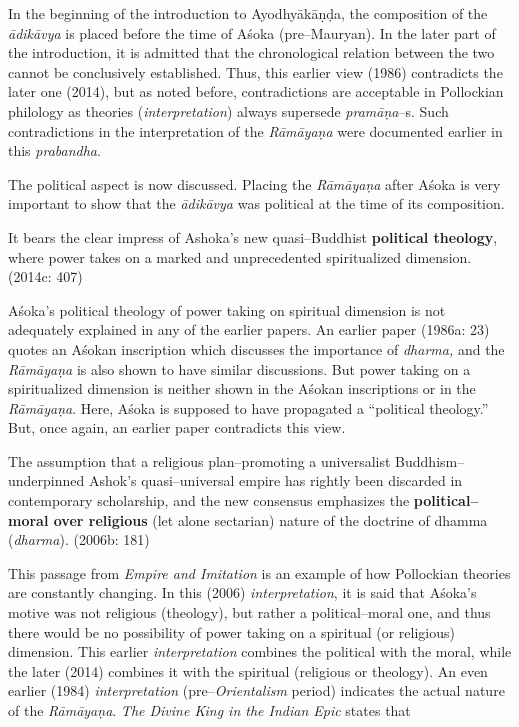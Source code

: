 In the beginning of the introduction to Ayodhyākāṇḍa, the composition of the \textit{ādikāvya} is placed before the time of Aśoka (pre–Mauryan). In the later part of the introduction, it is admitted that the chronological relation between the two cannot be conclusively established. Thus, this earlier view (1986) contradicts the later one (2014), but as noted before, contradictions are acceptable in Pollockian philology as theories (\textit{interpretation}) always supersede \textit{pramāṇa}–s. Such contradictions in the interpretation of the \textit{Rāmāyaṇa} were documented earlier in this \textit{prabandha}.

The political aspect is now discussed. Placing the \textit{Rāmāyaṇa }after Aśoka is very important to show that the \textit{ādikāvya} was political at the time of its composition.

\begin{myquote}
It bears the clear impress of Ashoka’s new quasi–Buddhist \textbf{political theology}, where power takes on a marked and unprecedented spiritualized dimension. (2014c: 407)
\end{myquote}

Aśoka’s political theology of power taking on spiritual dimension is not adequately explained in any of the earlier papers. An earlier paper (1986a: 23) quotes an Aśokan inscription which discusses the importance of \textit{dharma,} and the \textit{Rāmāyaṇa }is also shown to have similar discussions. But power taking on a spiritualized dimension is neither shown in the Aśokan inscriptions or in the \textit{Rāmāyaṇa}. Here, Aśoka is supposed to have propagated a “political theology.” But, once again, an earlier paper contradicts this view.

\begin{myquote}
The assumption that a religious plan–promoting a universalist Buddhism–underpinned Ashok’s quasi–universal empire has rightly been discarded in contemporary scholarship, and the new consensus emphasizes the \textbf{political–moral over religious} (let alone sectarian) nature of the doctrine of dhamma (\textit{dharma}). (2006b: 181)
\end{myquote}

This passage from \textit{Empire and Imitation} is an example of how Pollockian theories are constantly changing. In this (2006) \textit{interpretation}, it is said that Aśoka’s motive was not religious (theology), but rather a political–moral one, and thus there would be no possibility of power taking on a spiritual (or religious) dimension. This earlier \textit{interpretation} combines the political with the moral, while the later (2014) combines it with the spiritual (religious or theology). An even earlier (1984) \textit{interpretation} (pre–\textit{Orientalism} period) indicates the actual nature of the \textit{Rāmāyaṇa}. \textit{The Divine King in the Indian Epic} states that

